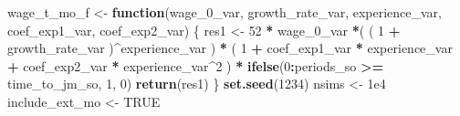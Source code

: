\documentclass[]{article}
\newenvironment{Shaded}{\begin{snugshade}}{\end{snugshade}}
\newcommand{\ControlFlowTok}[1]{\textcolor[rgb]{0.13,0.29,0.53}{\textbf{#1}}}
\newcommand{\DecValTok}[1]{\textcolor[rgb]{0.00,0.00,0.81}{#1}}
\newcommand{\FloatTok}[1]{\textcolor[rgb]{0.00,0.00,0.81}{#1}}
\newcommand{\KeywordTok}[1]{\textcolor[rgb]{0.13,0.29,0.53}{\textbf{#1}}}
\newcommand{\NormalTok}[1]{#1}
\newcommand{\OperatorTok}[1]{\textcolor[rgb]{0.81,0.36,0.00}{\textbf{#1}}}
\newcommand{\OtherTok}[1]{\textcolor[rgb]{0.56,0.35,0.01}{#1}}
\newcommand{\StringTok}[1]{\textcolor[rgb]{0.31,0.60,0.02}{#1}}
\begin{document}
\begin{Shaded}
\begin{Highlighting}[]
{\NormalTok{wage_t_mo_f <-}\StringTok{ }\ControlFlowTok{function}\NormalTok{(wage_}\DecValTok{0}\NormalTok{_var, growth_rate_var, experience_var, }
\NormalTok{                        coef_exp1_var, coef_exp2_var) \{}
\NormalTok{  res1 <-}\StringTok{ }\DecValTok{52} \OperatorTok{*}\StringTok{ }\NormalTok{wage_}\DecValTok{0}\NormalTok{_var }\OperatorTok{*}\NormalTok{( ( }\DecValTok{1} \OperatorTok{+}\StringTok{ }\NormalTok{growth_rate_var )}\OperatorTok{^}\NormalTok{experience_var ) }\OperatorTok{*}
\StringTok{    }\NormalTok{( }\DecValTok{1} \OperatorTok{+}\StringTok{ }\NormalTok{coef_exp1_var }\OperatorTok{*}\StringTok{ }\NormalTok{experience_var }\OperatorTok{+}\StringTok{ }\NormalTok{coef_exp2_var }\OperatorTok{*}\StringTok{ }\NormalTok{experience_var}\OperatorTok{^}\DecValTok{2}\NormalTok{ ) }\OperatorTok{*}
\StringTok{    }\KeywordTok{ifelse}\NormalTok{(}\DecValTok{0}\OperatorTok{:}\NormalTok{periods_so }\OperatorTok{>=}\StringTok{ }\NormalTok{time_to_jm_so, }\DecValTok{1}\NormalTok{, }\DecValTok{0}\NormalTok{)}
  \KeywordTok{return}\NormalTok{(res1)}
\NormalTok{\}}
\KeywordTok{set.seed}\NormalTok{(}\DecValTok{1234}\NormalTok{)}
\NormalTok{nsims <-}\StringTok{ }\FloatTok{1e4}
\NormalTok{include_ext_mo <-}\StringTok{ }\OtherTok{TRUE}

}
\end{Highlighting}
\end{Shaded}
\end{document}
